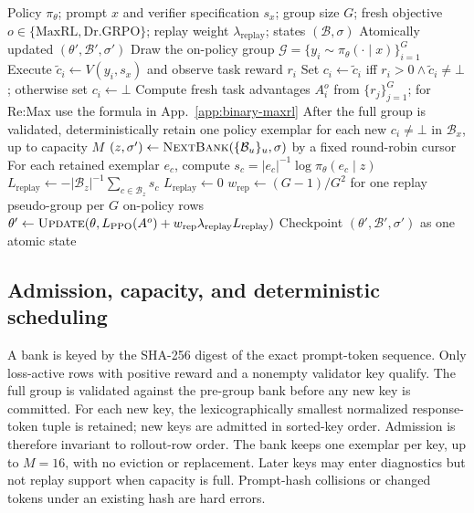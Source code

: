 \documentclass{article}
\newcommand{\1}{\mathbf 1}
\theoremstyle{remark}
\theoremstyle{definition}
\theoremstyle{plain}
\begin{document}
\begin{algorithm}[H]
  \caption{One Re:Max optimizer update}
  \label{alg:verified-replay-update}
  \small
  \begin{algorithmic}[1]
    \REQUIRE Policy $\pi_\theta$; prompt $x$ and verifier specification
      $s_x$; group size $G$; fresh objective $o\in\{\mathrm{MaxRL},\mathrm{Dr.GRPO}\}$; replay weight $\lambda_{\mathrm{replay}}$;
      states $(\mathcal B,\sigma)$
    \ENSURE Atomically updated $(\theta',\mathcal B',\sigma')$
    \STATE Draw the on-policy group
      $\mathcal G=\{y_i\sim\pi_\theta(\cdot\mid x)\}_{i=1}^G$
      \STATE Execute $\widetilde c_i\gets V(y_i,s_x)$ and observe task
        reward $r_i$
      \STATE Set $c_i\gets\widetilde c_i$ iff
        $r_i>0\wedge\widetilde c_i\ne\bot$; otherwise set $c_i\gets\bot$
    \ENDFOR
    \STATE Compute fresh task advantages $A_i^{o}$ from $\{r_j\}_{j=1}^G$; for Re:Max use the formula in App.~\ref{app:binary-maxrl}
    \STATE After the full group is validated, deterministically retain one
      policy exemplar for each new $c_i\ne\bot$ in $\mathcal B_x$, up to
      capacity $M$
    \STATE $(z,\sigma')\gets\textsc{NextBank}
      (\{\mathcal B_u\}_u,\sigma)$ by a fixed round-robin cursor
      \STATE For each retained exemplar $e_c$, compute
        $s_c=|e_c|^{-1}\log\pi_\theta(e_c\mid z)$
      \STATE $L_{\mathrm{replay}}\gets-|\mathcal B_z|^{-1}
        \sum_{c\in\mathcal B_z}s_c$
    \ELSE
      \STATE $L_{\mathrm{replay}}\gets0$
    \ENDIF
    \STATE $w_{\mathrm{rep}}\gets(G-1)/G^2$ for one replay
      pseudo-group per $G$ on-policy rows
    \STATE $\theta'\gets\textsc{Update}
      (\theta,L_{\mathrm{PPO}}(A^{o})
      +w_{\mathrm{rep}}\lambda_{\mathrm{replay}}L_{\mathrm{replay}})$
    \STATE Checkpoint $(\theta',\mathcal B',\sigma')$ as one atomic state
\end{algorithmic}
\end{algorithm}

\subsection{Admission, capacity, and deterministic scheduling}
\label{app:algorithm-bank}

A bank is keyed by the SHA-256 digest of the exact prompt-token sequence.
Only loss-active rows with positive reward and a nonempty validator key
qualify. The full group is validated against the pre-group bank before
any new key is committed. For each new key, the lexicographically smallest
normalized response-token tuple is retained; new keys are admitted in
sorted-key order. Admission is therefore invariant to rollout-row order.
The bank keeps one exemplar per key, up to $M=16$, with no eviction or
replacement. Later keys may enter diagnostics but not replay support when
capacity is full. Prompt-hash collisions or changed tokens under an
existing hash are hard errors.
\end{document}

